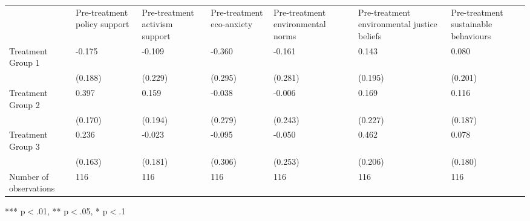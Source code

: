 \documentclass{article}
\begin{document}
\begin{table}[!h]
\centering
\begin{tabular}{lllllll}
\cline{1-7}
\multicolumn{1}{|l}{} &
  \multicolumn{1}{|l}{Pre-treatment policy support} &
  \multicolumn{1}{|l}{Pre-treatment activism support} &
  \multicolumn{1}{|l}{Pre-treatment eco-anxiety} &
  \multicolumn{1}{|l}{Pre-treatment environmental norms} &
  \multicolumn{1}{|l}{Pre-treatment environmental justice beliefs} &
  \multicolumn{1}{|l|}{Pre-treatment sustainable behaviours} \\
\cline{1-7}
\multicolumn{1}{|l}{Treatment Group 1} &
  \multicolumn{1}{|l}{-0.175} &
  \multicolumn{1}{|l}{-0.109} &
  \multicolumn{1}{|l}{-0.360} &
  \multicolumn{1}{|l}{-0.161} &
  \multicolumn{1}{|l}{0.143} &
  \multicolumn{1}{|l|}{0.080} \\
\cline{1-7}
\multicolumn{1}{|l}{} &
  \multicolumn{1}{|l}{(0.188)} &
  \multicolumn{1}{|l}{(0.229)} &
  \multicolumn{1}{|l}{(0.295)} &
  \multicolumn{1}{|l}{(0.281)} &
  \multicolumn{1}{|l}{(0.195)} &
  \multicolumn{1}{|l|}{(0.201)} \\
\cline{1-7}
\multicolumn{1}{|l}{Treatment Group 2} &
  \multicolumn{1}{|l}{0.397} &
  \multicolumn{1}{|l}{0.159} &
  \multicolumn{1}{|l}{-0.038} &
  \multicolumn{1}{|l}{-0.006} &
  \multicolumn{1}{|l}{0.169} &
  \multicolumn{1}{|l|}{0.116} \\
\cline{1-7}
\multicolumn{1}{|l}{} &
  \multicolumn{1}{|l}{(0.170)} &
  \multicolumn{1}{|l}{(0.194)} &
  \multicolumn{1}{|l}{(0.279)} &
  \multicolumn{1}{|l}{(0.243)} &
  \multicolumn{1}{|l}{(0.227)} &
  \multicolumn{1}{|l|}{(0.187)} \\
\cline{1-7}
\multicolumn{1}{|l}{Treatment Group 3} &
  \multicolumn{1}{|l}{0.236} &
  \multicolumn{1}{|l}{-0.023} &
  \multicolumn{1}{|l}{-0.095} &
  \multicolumn{1}{|l}{-0.050} &
  \multicolumn{1}{|l}{0.462} &
  \multicolumn{1}{|l|}{0.078} \\
\cline{1-7}
\multicolumn{1}{|l}{} &
  \multicolumn{1}{|l}{(0.163)} &
  \multicolumn{1}{|l}{(0.181)} &
  \multicolumn{1}{|l}{(0.306)} &
  \multicolumn{1}{|l}{(0.253)} &
  \multicolumn{1}{|l}{(0.206)} &
  \multicolumn{1}{|l|}{(0.180)} \\
\cline{1-7}
\multicolumn{1}{|l}{Number of observations} &
  \multicolumn{1}{|l}{116} &
  \multicolumn{1}{|l}{116} &
  \multicolumn{1}{|l}{116} &
  \multicolumn{1}{|l}{116} &
  \multicolumn{1}{|l}{116} &
  \multicolumn{1}{|l|}{116} \\
\cline{1-7}
\end{tabular}

\footnotesize{
*** p$<$.01, ** p$<$.05, * p$<$.1
}
\end{table}
\end{document}

